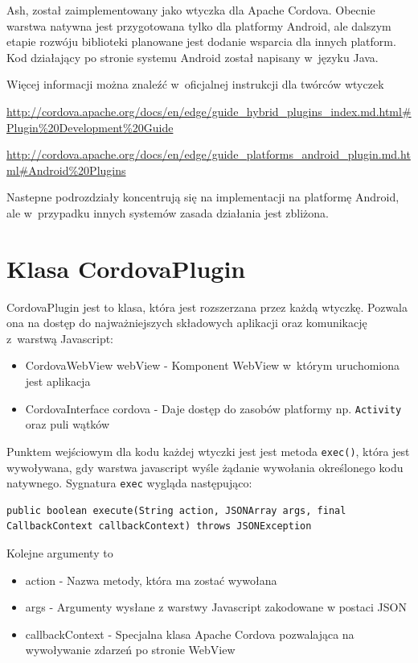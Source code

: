 \documentclass[brudnopis]{xmgr}
\begin{document}
Ash, został zaimplementowany jako wtyczka dla Apache Cordova. Obecnie warstwa natywna jest przygotowana tylko dla platformy Android, ale dalszym etapie rozwóju biblioteki planowane jest dodanie wsparcia dla innych platform. Kod działający po stronie systemu Android został napisany w~języku Java.

Więcej informacji można znaleźć w~oficjalnej instrukcji dla twórców wtyczek

\url{http://cordova.apache.org/docs/en/edge/guide\_hybrid\_plugins\_index.md.html\#Plugin\%20Development\%20Guide}  

\url{http://cordova.apache.org/docs/en/edge/guide\_platforms\_android\_plugin.md.html\#Android\%20Plugins}   

Nastepne podrozdziały koncentrują się na implementacji na platformę Android, ale w~przypadku innych systemów zasada działania jest zbliżona.

\section{Klasa CordovaPlugin}

CordovaPlugin jest to klasa, która jest rozszerzana przez każdą wtyczkę. Pozwala ona na dostęp do najważniejszych składowych aplikacji oraz komunikację z~warstwą Javascript: 

\begin{itemize}
  \item CordovaWebView webView - Komponent WebView w~którym uruchomiona jest aplikacja
  \item CordovaInterface cordova - Daje dostęp do zasobów platformy np. \texttt{Activity} oraz puli wątków
\end{itemize}

Punktem wejściowym dla kodu każdej wtyczki jest jest metoda \texttt{exec()}, która jest wywoływana, gdy warstwa javascript wyśle żądanie wywołania określonego kodu natywnego. Sygnatura \texttt{exec} wygląda następująco:

\begin{lstlisting}
public boolean execute(String action, JSONArray args, final CallbackContext callbackContext) throws JSONException
\end{lstlisting}

Kolejne argumenty to
\begin{itemize}
  \item action - Nazwa metody, która ma zostać wywołana
  \item args - Argumenty wysłane z warstwy Javascript zakodowane w postaci JSON
  \item callbackContext - Specjalna klasa Apache Cordova pozwalająca na wywoływanie zdarzeń po stronie WebView 
\end{itemize}
\end{document}
